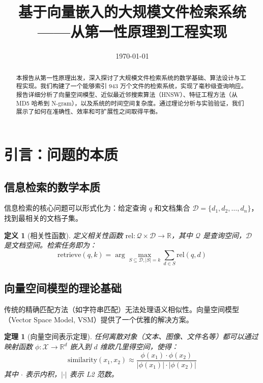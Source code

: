 \documentclass[12pt,a4paper]{article}
\title{\textbf{基于向量嵌入的大规模文件检索系统\\——从第一性原理到工程实现}}
\date{\today}
\newtheorem{theorem}{定理}[section]
\newtheorem{definition}{定义}[section]
\begin{document}
\maketitle

\begin{abstract}
本报告从第一性原理出发，深入探讨了大规模文件检索系统的数学基础、算法设计与工程实现。我们构建了一个能够索引 943 万个文件的检索系统，实现了毫秒级查询响应。报告详细分析了向量空间模型、近似最近邻搜索算法（HNSW）、特征工程方法（从 MD5 哈希到 N-gram），以及系统的时间空间复杂度。通过理论分析与实验验证，我们展示了如何在准确性、效率和可扩展性之间取得平衡。
\end{abstract}

\tableofcontents
\newpage

\section{引言：问题的本质}

\subsection{信息检索的数学本质}

信息检索的核心问题可以形式化为：给定查询 $q$ 和文档集合 $\mathcal{D} = \{d_1, d_2, \ldots, d_n\}$，找到最相关的文档子集。

\begin{definition}[相关性函数]
定义相关性函数 $\text{rel}: \mathcal{Q} \times \mathcal{D} \rightarrow \mathbb{R}$，其中 $\mathcal{Q}$ 是查询空间，$\mathcal{D}$ 是文档空间。检索任务即为：
\begin{equation}
\text{retrieve}(q, k) = \arg\max_{S \subseteq \mathcal{D}, |S|=k} \sum_{d \in S} \text{rel}(q, d)
\end{equation}
\end{definition}

\subsection{向量空间模型的理论基础}

传统的精确匹配方法（如字符串匹配）无法处理语义相似性。向量空间模型（Vector Space Model, VSM）提供了一个优雅的解决方案。

\begin{theorem}[向量空间表示定理]
任何离散对象（文本、图像、文件名等）都可以通过映射函数 $\phi: \mathcal{X} \rightarrow \mathbb{R}^d$ 嵌入到 $d$ 维欧几里得空间，使得：
\begin{equation}
\text{similarity}(x_1, x_2) \approx \frac{\phi(x_1) \cdot \phi(x_2)}{|\phi(x_1)| \cdot |\phi(x_2)|}
\end{equation}
其中 $\cdot$ 表示内积，$|\cdot|$ 表示 L2 范数。
\end{theorem}
\end{document}
